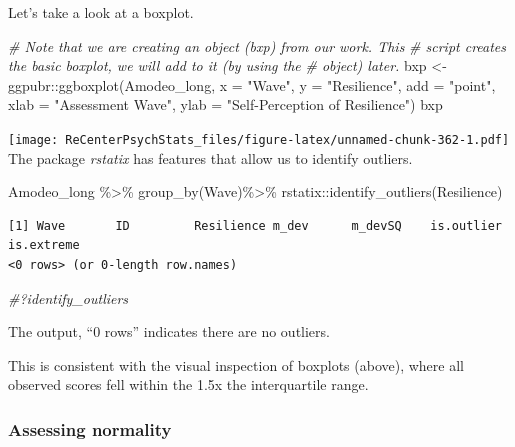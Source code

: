 \documentclass[
  11pt,
]{book}
\newenvironment{Shaded}{\begin{snugshade}}{\end{snugshade}}
\newcommand{\AttributeTok}[1]{\textcolor[rgb]{0.77,0.63,0.00}{#1}}
\newcommand{\CommentTok}[1]{\textcolor[rgb]{0.56,0.35,0.01}{\textit{#1}}}
\newcommand{\FunctionTok}[1]{\textcolor[rgb]{0.00,0.00,0.00}{#1}}
\newcommand{\NormalTok}[1]{#1}
\newcommand{\OtherTok}[1]{\textcolor[rgb]{0.56,0.35,0.01}{#1}}
\newcommand{\SpecialCharTok}[1]{\textcolor[rgb]{0.00,0.00,0.00}{#1}}
\newcommand{\StringTok}[1]{\textcolor[rgb]{0.31,0.60,0.02}{#1}}
\begin{document}
Let's take a look at a boxplot.

\begin{Shaded}
\begin{Highlighting}[]
\CommentTok{\# Note that we are creating an object (bxp) from our work.  This}
\CommentTok{\# script creates the basic boxplot, we will add to it (by using the}
\CommentTok{\# object) later.}
\NormalTok{bxp }\OtherTok{\textless{}{-}}\NormalTok{ ggpubr}\SpecialCharTok{::}\FunctionTok{ggboxplot}\NormalTok{(Amodeo\_long, }\AttributeTok{x =} \StringTok{"Wave"}\NormalTok{, }\AttributeTok{y =} \StringTok{"Resilience"}\NormalTok{, }\AttributeTok{add =} \StringTok{"point"}\NormalTok{,}
    \AttributeTok{xlab =} \StringTok{"Assessment Wave"}\NormalTok{, }\AttributeTok{ylab =} \StringTok{"Self{-}Perception of Resilience"}\NormalTok{)}
\NormalTok{bxp}
\end{Highlighting}
\end{Shaded}

\texttt{[image: ReCenterPsychStats\_files/figure-latex/unnamed-chunk-362-1.pdf]}
The package \emph{rstatix} has features that allow us to identify outliers.

\begin{Shaded}
\begin{Highlighting}[]
\NormalTok{Amodeo\_long }\SpecialCharTok{\%\textgreater{}\%}
  \FunctionTok{group\_by}\NormalTok{(Wave)}\SpecialCharTok{\%\textgreater{}\%}
\NormalTok{  rstatix}\SpecialCharTok{::}\FunctionTok{identify\_outliers}\NormalTok{(Resilience)}
\end{Highlighting}
\end{Shaded}

\begin{verbatim}
[1] Wave       ID         Resilience m_dev      m_devSQ    is.outlier is.extreme
<0 rows> (or 0-length row.names)
\end{verbatim}

\begin{Shaded}
\begin{Highlighting}[]
\CommentTok{\#?identify\_outliers}
\end{Highlighting}
\end{Shaded}

The output, ``0 rows'' indicates there are no outliers.

This is consistent with the visual inspection of boxplots (above), where all observed scores fell within the 1.5x the interquartile range.

\hypertarget{assessing-normality}{%
\subsubsection{Assessing normality}\label{assessing-normality}}
\end{document}
